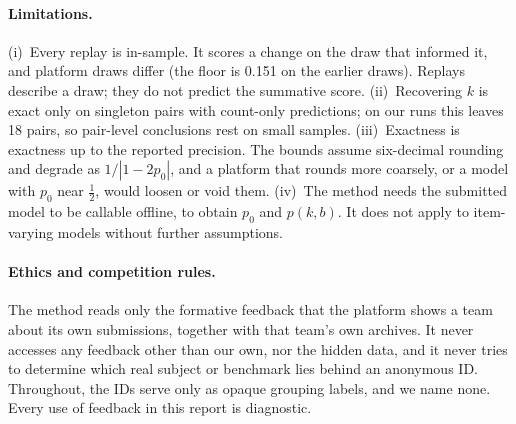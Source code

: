 \paragraph{Limitations.}
(i)~Every replay is in-sample. It scores a change on the draw that informed it, and platform draws differ (the
floor is 0.151 on the earlier draws). Replays describe a draw; they do not predict the summative score.
(ii)~Recovering $k$ is exact only on singleton pairs with count-only predictions; on our runs this leaves 18 pairs, so
pair-level conclusions rest on small samples. (iii)~Exactness is exactness up to the
reported precision. The bounds assume six-decimal rounding and degrade as $1/|1-2p_0|$, and a platform that rounds
more coarsely, or a model with $p_0$ near $\frac12$, would loosen or void them. (iv)~The method needs the submitted
model to be callable offline, to obtain $p_0$ and $p(k,b)$. It does not apply to item-varying models without
further assumptions.

\paragraph{Ethics and competition rules.}
The method reads only the formative feedback that the platform shows a team about its own submissions, together with
that team's own archives. It never accesses any feedback other than our own, nor the hidden data, and it never tries to determine
which real subject or benchmark lies behind an anonymous ID. Throughout, the IDs serve only as opaque grouping labels,
and we name none. Every use of feedback in this report is diagnostic.
